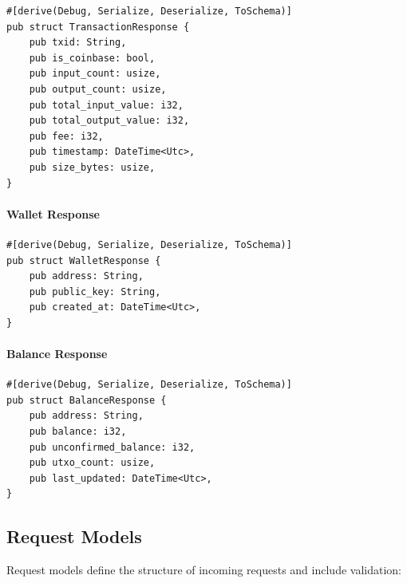 \begin{listing}[H]
\caption{Transaction response model}
\label{lst:models-transaction-response}
\begin{verbatim}
#[derive(Debug, Serialize, Deserialize, ToSchema)]
pub struct TransactionResponse {
    pub txid: String,
    pub is_coinbase: bool,
    pub input_count: usize,
    pub output_count: usize,
    pub total_input_value: i32,
    pub total_output_value: i32,
    pub fee: i32,
    pub timestamp: DateTime<Utc>,
    pub size_bytes: usize,
}
\end{verbatim}
\end{listing}

\paragraph{Wallet Response}

\begin{listing}[H]
\caption{Wallet response model}
\label{lst:models-wallet-response}
\begin{verbatim}
#[derive(Debug, Serialize, Deserialize, ToSchema)]
pub struct WalletResponse {
    pub address: String,
    pub public_key: String,
    pub created_at: DateTime<Utc>,
}
\end{verbatim}
\end{listing}

\paragraph{Balance Response}

\begin{listing}[H]
\caption{Balance response model}
\label{lst:models-balance-response}
\begin{verbatim}
#[derive(Debug, Serialize, Deserialize, ToSchema)]
pub struct BalanceResponse {
    pub address: String,
    pub balance: i32,
    pub unconfirmed_balance: i32,
    pub utxo_count: usize,
    pub last_updated: DateTime<Utc>,
}
\end{verbatim}
\end{listing}

\subsection{Request Models}

Request models define the structure of incoming requests and include validation:


